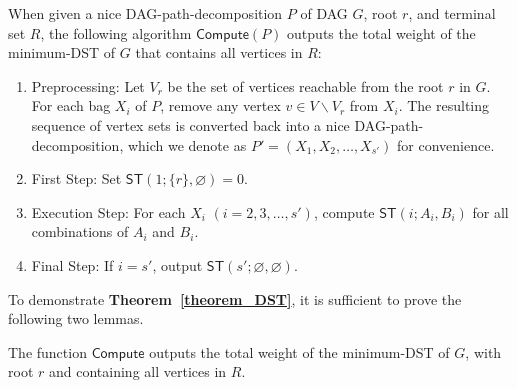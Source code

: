 \documentclass[runningheads]{llncs}
\theoremstyle{plain}
\theoremstyle{definition}
\begin{document}
When given a nice DAG-path-decomposition $P$ of DAG $G$, root $r$, and terminal set $R$, the following algorithm $\mathsf{Compute}(P)$ outputs the total weight of the minimum-DST of $G$ that contains all vertices in $R$:

\begin{enumerate}
    \item Preprocessing: Let $V_r$ be the set of vertices reachable from the root $r$ in $G$. For each bag $X_i$ of $P$, remove any vertex $v \in V \backslash V_r$ from $X_i$. The resulting sequence of vertex sets is converted back into a nice DAG-path-decomposition, which we denote as $P' = (X_1, X_2, \dots , X_{s'})$ for convenience.
    \item First Step: Set $\mathsf{ST}(1; \{r\}, \varnothing) = 0$.
    \item Execution Step: For each $X_i$ $(i=2, 3, \dots, s')$, compute $\mathsf{ST}(i; A_i, B_i)$ for all combinations of $A_i$ and $B_i$.
    \item Final Step: If $i = s'$, output $\mathsf{ST}(s'; \varnothing, \varnothing)$.
\end{enumerate}

To demonstrate \textbf{Theorem~\ref{theorem_DST}}, it is sufficient to prove the following two lemmas.

\begin{lemma}\label{dst}
    The function $\mathsf{Compute}$ outputs the total weight of the minimum-DST of $G$, with root $r$ and containing all vertices in $R$.
\end{lemma}
\end{document}
